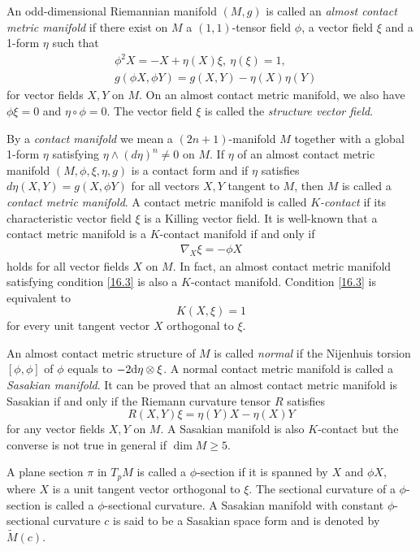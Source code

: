 \documentclass{amsart}
\theoremstyle{plain}
\numberwithin{equation}{section}
\theoremstyle{remark}
\numberwithin{equation}{section}
\begin{document}
An odd-dimensional Riemannian manifold $(M,g)$ is called an {\em almost contact metric manifold} if there exist on $M$ a $(1,1)$-tensor field $\phi $, a vector field $\xi $ and a 1-form $\eta $ such that
\begin{align} &\label{16.1}\phi ^{2}X=-X+\eta ( X) \xi , \ \eta (\xi )=1,
\\& \label{16.2} g(\phi X,\phi Y)=g(X,Y) -\eta ( X) \eta ( Y) \end{align}
for  vector fields $X,Y$ on $M$. On an almost contact metric manifold, we also have $\phi \xi =0$ and $\eta \circ \phi =0$. The vector field $\xi$  is called the {\em structure vector field}.

By a {\it contact manifold\/} we mean a  $(2n+1)$-manifold $M$ together with  a global 1-form $\eta$  satisfying $\eta\wedge (d\eta)^n \ne 0$ on $M$.
If $\eta$ of  an almost contact metric manifold $(M,\phi,\xi,\eta,g)$ is a contact form and if  $\eta$ satisfies $d\eta
(X,Y)=g(X,\phi Y)$ for all vectors  $X,Y$ tangent to $M$, then
$M$ is called a {\it contact metric manifold}.
A contact metric manifold is called {\it $K$-contact} if its characteristic vector field $\xi$ is a Killing vector field.
 It is well-known that a contact metric manifold is a $K$-contact manifold if and only if
\begin{align}  \label{16.3}\nabla _{X}\xi =-\phi X \end{align}
holds for all vector fields $X$ on $M$. In fact, an almost contact metric manifold satisfying condition  \eqref{16.3} is also a $K$-contact manifold. Condition \eqref{16.3} is equivalent to \begin{equation}
K(X, \xi)=1 \label{16.4}\end{equation}
for every unit tangent vector $X$  orthogonal to  $\xi$.

An almost contact metric structure of $M$ is called {\em normal} if the Nijenhuis torsion $[\phi ,\phi ]$ of $\phi $ equals to $-2{\rm d}\eta \otimes \xi $. A normal contact
metric manifold is called a {\em Sasakian manifold}. It can be proved that an almost contact metric manifold is Sasakian if and only if the Riemann curvature tensor $R$ satisfies
\begin{equation}\label{16.5} R(X,Y)\xi=\eta(Y)X-\eta(X)Y\end{equation}
 for any vector fields $X,Y$ on $M$.
A Sasakian manifold is also $K$-contact but the converse is not true in general if $\dim M\geq 5$.

A plane section $\pi$ in $T_{p} M$ is called a $\phi$-section if it is spanned by $X$ and $\phi X$, where $X$ is a unit tangent vector orthogonal to $\xi$. The sectional curvature of a $\phi$-section is
called a $\phi$-sectional curvature. A Sasakian manifold with constant $\phi$-sectional curvature
$c$ is said to be a Sasakian space form and is denoted by $\tilde M(c)$.
\end{document}
